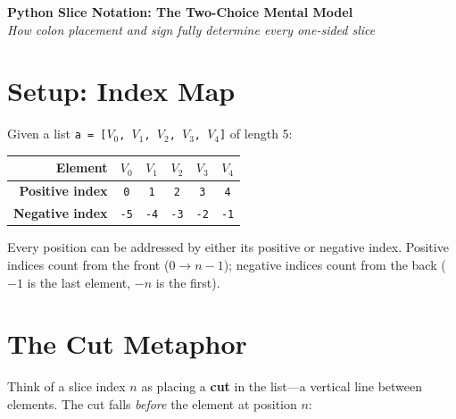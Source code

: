 \documentclass[11pt]{article}
\newcommand{\py}[1]{\texttt{\color{pyblue}#1}}
\newcommand{\val}[1]{\ensuremath{V_{#1}}}
\begin{document}
\begin{center}
{\Large\bfseries Python Slice Notation: The Two-Choice Mental Model}\\[8pt]
{\itshape How colon placement and sign fully determine every one-sided slice}
\end{center}

\vspace{12pt}

\section{Setup: Index Map}

Given a list \py{a = [\val{0}, \val{1}, \val{2}, \val{3}, \val{4}]} of length 5:

\begin{center}
\renewcommand{\arraystretch}{1.3}
\begin{tabular}{r*{5}{c}}
\toprule
\textbf{Element}   & $\val{0}$ & $\val{1}$ & $\val{2}$ & $\val{3}$ & $\val{4}$ \\
\midrule
\textbf{Positive index} & \texttt{0} & \texttt{1} & \texttt{2} & \texttt{3} & \texttt{4} \\
\textbf{Negative index}  & \texttt{-5} & \texttt{-4} & \texttt{-3} & \texttt{-2} & \texttt{-1} \\
\bottomrule
\end{tabular}
\end{center}

\medskip
\noindent
Every position can be addressed by either its positive or negative index.
Positive indices count from the front ($0 \to n{-}1$); negative indices count from the back ($-1$ is the last element, $-n$ is the first).

\section{The Cut Metaphor}

Think of a slice index $n$ as placing a \textbf{cut} in the list---a vertical line between elements.
The cut falls \emph{before} the element at position $n$:

\begin{center}
\end{center}
\end{document}
